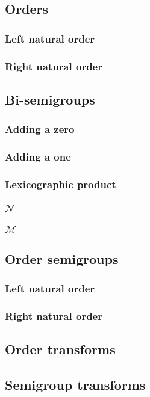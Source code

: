 \documentclass[10pt]{article}
\begin{document}
\subsection{Orders} 
\label{sec:orders:proofs} 
\subsubsection{Left natural order}
\label{sec:llte:proofs} 
 
\subsubsection{Right natural order}
\label{sec:llte:proofs} 
 

\subsection{Bi-semigroups} 
\label{sec:bisemigroups:proofs} 
\subsubsection{Adding a zero} 
\label{sec:addzero:proofs} 
 
\subsubsection{Adding a one} 
\label{sec:addone:proofs} 
 
\subsubsection{Lexicographic product} 
\label{sec:bsllex:proofs} 
 
\subsubsection{$\mathcal{N}$}
\label{sec:bsN:proofs} 
 
\subsubsection{$\mathcal{M}$}
\label{sec:bsM:proofs} 
 

\subsection{Order semigroups} 
\label{sec:ordersemigroups:proofs} 
\subsubsection{Left natural order}
\label{sec:osllte:proofs} 
 
\subsubsection{Right natural order}
\label{sec:osllte:proofs} 
 

\subsection{Order transforms} 
\label{sec:ordertransforms:proofs} 

\subsection{Semigroup transforms} 
\label{sec:semigrouptransforms:proofs} 
\end{document}
